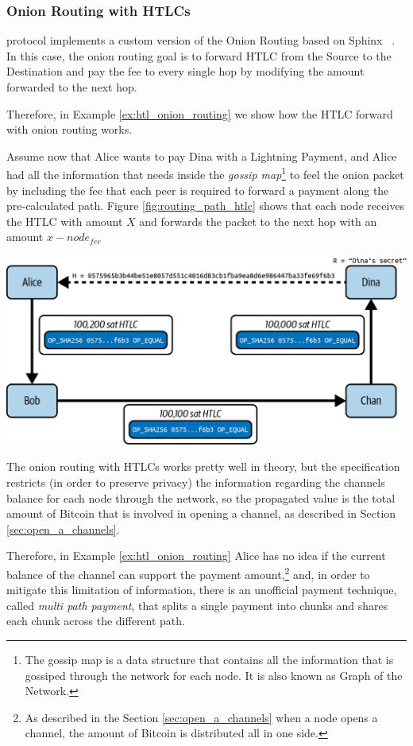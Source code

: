 \subsubsection{Onion Routing with HTLCs}

{\LN} protocol implements a custom version of the Onion Routing based on Sphinx ~\cite{cryptoeprint:2008/475}. In this case, the onion routing goal is to forward HTLC from the Source to the Destination and pay the fee to
every single hop by modifying the amount forwarded to the next hop.

Therefore, in Example \ref{ex:htl_onion_routing} we show how the HTLC forward with onion routing works.

\begin{example}
  \label{ex:htl_onion_routing}
  Assume now that Alice wants to pay Dina with a Lightning Payment, and Alice had all the
  information that needs inside the \emph{gossip map}\footnote{The gossip map is a data structure that contains all the information that is gossiped through the network for each node. It is also known as Graph of the Network.} to feel the
  onion packet by including the fee that each peer is required to forward a payment
  along the pre-calculated path. Figure \ref{fig:routing_path_htlc} shows that each node receives the HTLC with
  amount $X$ and forwards the packet to the next hop with an amount $x - node_{fee}$

  {\centering
      \includegraphics[width=0.6\columnwidth]{imgs/mtln_1008.png}
  \par}  
\end{example}

The onion routing with HTLCs works pretty well in theory, but the {\LN} specification restricts (in order to preserve privacy) the information regarding
the channels balance for each node through the network, so the propagated value is the total amount of Bitcoin that is involved in opening a channel, as described in Section \ref{sec:open_a_channels}.

Therefore, in Example \ref{ex:htl_onion_routing} Alice has no idea if the current balance of the channel can support the payment amount,\footnote{As described in the Section \ref{sec:open_a_channels} when a node opens a channel, the amount of Bitcoin is distributed all in one side.} and, in order to mitigate this limitation of information, there is an unofficial payment technique, called \emph{multi path payment}, that splits a single payment into chunks and shares each chunk across the different path.
